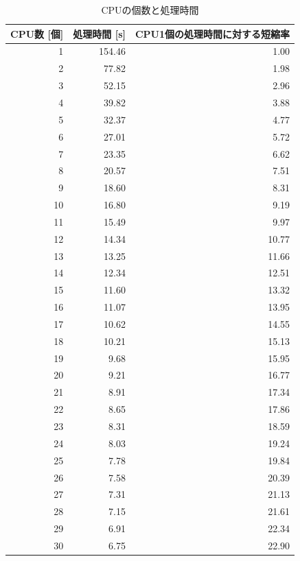 \documentclass[a4j,titlepage]{jsarticle}
\newcommand{\chuo}[1]{\multicolumn{1}{|c|}{#1}}
\begin{document}
\begin{table}[htbp]
  \centering
  \caption{CPUの個数と処理時間}
  \label{tb:kadai6}

  \begin{tabular}{|r|r|r|}
    \hline
    \chuo{CPU数 [個]} & \chuo{処理時間 [s]} & \chuo{CPU1個の処理時間に対する短縮率} \\ \hline \hline
    1 & 154.46 & 1.00 \\ \hline
    2 & 77.82 & 1.98 \\ \hline
    3 & 52.15 & 2.96 \\ \hline
    4 & 39.82 & 3.88 \\ \hline
    5 & 32.37 & 4.77 \\ \hline
    6 & 27.01 & 5.72 \\ \hline
    7 & 23.35 & 6.62 \\ \hline
    8 & 20.57 & 7.51 \\ \hline
    9 & 18.60 & 8.31 \\ \hline
    10 & 16.80 & 9.19 \\ \hline
    11 & 15.49 & 9.97 \\ \hline
    12 & 14.34 & 10.77 \\ \hline
    13 & 13.25 & 11.66 \\ \hline
    14 & 12.34 & 12.51 \\ \hline
    15 & 11.60 & 13.32 \\ \hline
    16 & 11.07 & 13.95 \\ \hline
    17 & 10.62 & 14.55 \\ \hline
    18 & 10.21 & 15.13 \\ \hline
    19 & 9.68 & 15.95 \\ \hline
    20 & 9.21 & 16.77 \\ \hline
    21 & 8.91 & 17.34 \\ \hline
    22 & 8.65 & 17.86 \\ \hline
    23 & 8.31 & 18.59 \\ \hline
    24 & 8.03 & 19.24 \\ \hline
    25 & 7.78 & 19.84 \\ \hline
    26 & 7.58 & 20.39 \\ \hline
    27 & 7.31 & 21.13 \\ \hline
    28 & 7.15 & 21.61 \\ \hline
    29 & 6.91 & 22.34 \\ \hline
    30 & 6.75 & 22.90 \\ \hline
  \end{tabular}
\end{table}
\end{document}
